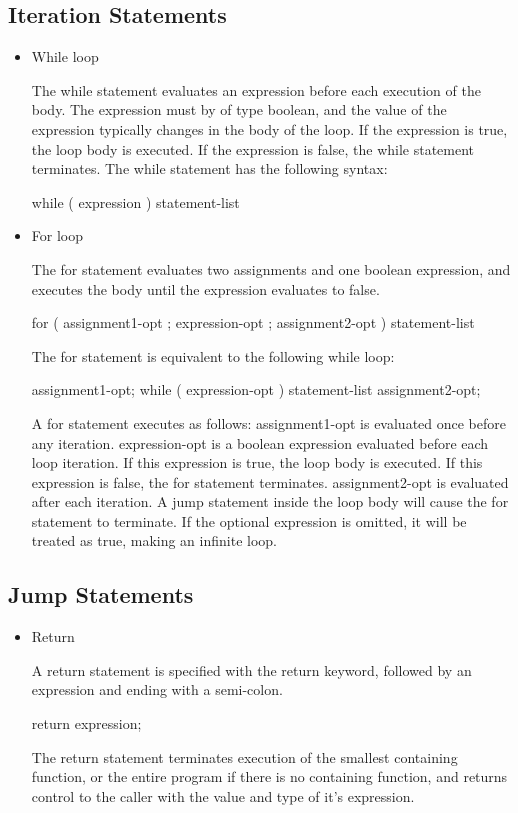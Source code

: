 \documentclass[oneside]{book}
\begin{document}
\subsection{Iteration Statements}
\begin{itemize}

\item While loop

The while statement evaluates an expression before each execution of the body. The expression must by of type boolean, and the value of the expression typically changes in the body of the loop. If the expression is true, the loop body is executed. If the expression is false, the while statement terminates. The while statement has the following syntax:

\begin{code}
while ( expression )
{
  statement-list
}
\end{code}

\item For loop

The for statement evaluates two assignments and one boolean expression, and executes the body until the expression evaluates to false.

\begin{code}
for ( assignment1-opt ; expression-opt ; assignment2-opt ) 
{
  statement-list
}
\end{code}

The for statement is equivalent to the following while loop:

\begin{code}
assignment1-opt;
while ( expression-opt )
{
  statement-list
  assignment2-opt;
}
\end{code}

A for statement executes as follows:
assignment1-opt is evaluated once before any iteration. expression-opt is a boolean expression evaluated before each loop iteration. If this expression is true, the loop body is executed. If this expression is false, the for statement terminates. assignment2-opt is evaluated after each iteration. A jump statement inside the loop body will cause the for statement to terminate. If the optional expression is omitted, it will be treated as true, making an infinite loop.
\end{itemize}      

\subsection{Jump Statements}
\begin{itemize}
\item Return

A return statement is specified with the return keyword, followed by an expression and ending with a semi-colon.
\begin{code}
return expression;
\end{code}
The return statement terminates execution of the smallest containing function, or the entire program if there is no containing function, and returns control to the caller with the value and type of it's expression. 

\end{itemize} 
\end{document}
